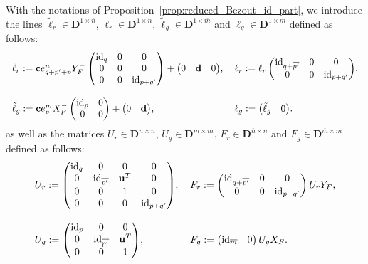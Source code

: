 \documentclass[10pt]{article}
\newcommand\g[1]{\textbf{#1}}
\newcommand\id[1]{\text{id}_{#1}}
\newcommand\D{\g{D}}
\begin{document}
With the notations of Proposition~\ref{prop:reduced_Bezout_id_part},
we introduce the lines $\tilde{\ell}_r\in\D^{1\times\overline{n}}$,
$\ell_r\in\D^{1\times n}$, $\tilde{\ell}_g\in\D^{1\times\overline{m}}$
and $\ell_g\in\D^{1\times m}$ defined as follows:
\[\begin{tabular}{l l}
$\tilde{\ell}_r:=\g{c}e^n_{q+p'+p}Y_F^-\begin{pmatrix}
\id{q} & 0 & 0\\
0 & 0 & 0\\
0 & 0 & \id{p+q'}
\end{pmatrix}+\begin{pmatrix} 0 & \g{d} & 0
\end{pmatrix}$, &
$\ell_r:=\tilde{\ell_r}\begin{pmatrix}
  \id{q+\overline{p'}} & 0 & 0\\
  0 & 0 & \id{p+q'}
\end{pmatrix}$,\\
& \\
$\tilde{\ell}_g:=\g{c}e^m_pX_F^-\begin{pmatrix}
\id{p} & 0\\
0 & 0\end{pmatrix}+\begin{pmatrix}0 & \g{d}\end{pmatrix}$, &
$\ell_g:=\begin{pmatrix}\tilde{\ell}_g & 0\end{pmatrix}$.
\end{tabular}\]
as well as the matrices $U_r\in\D^{n\times n}$, $U_g\in\D^{m\times m}$,
$F_r\in\D^{\overline{n}\times n}$ and $F_g\in\D^{\overline{m}\times m}$
defined as follows:
\[\begin{tabular}{l l}
$U_r:=\begin{pmatrix}
\id{q} & 0 & 0 & 0\\
0 & \id{\overline{p'}} & \g{u}^T & 0\\
0 & 0 & 1 & 0\\
0 & 0 & 0 & \id{p+q'}
\end{pmatrix}$, &
$F_r:=\begin{pmatrix}
\id{q+\overline{p'}} & 0 & 0\\
0 & 0 & \id{p+q'}
\end{pmatrix}U_rY_F$,\\
& \\
$U_g:=\begin{pmatrix}
\id{p} & 0 & 0\\
0 & \id{\overline{p'}} & \g{u}^T\\
0 & 0 & 1\end{pmatrix}$,
&
$F_g:=\begin{pmatrix}\id{\overline{m}} & 0\end{pmatrix}U_gX_F$.
\end{tabular}\]
\end{document}
